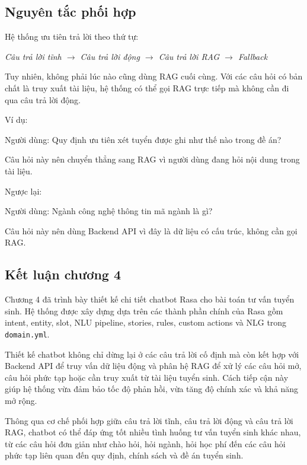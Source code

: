 \subsection*{Nguyên tắc phối hợp}

Hệ thống ưu tiên trả lời theo thứ tự:

\textit{Câu trả lời tĩnh $\rightarrow$ Câu trả lời động $\rightarrow$ Câu trả lời RAG $\rightarrow$ Fallback}

Tuy nhiên, không phải lúc nào cũng dùng RAG cuối cùng. Với các câu hỏi có bản chất là truy xuất tài liệu, hệ thống có thể gọi RAG trực tiếp mà không cần đi qua câu trả lời động.

Ví dụ:

Người dùng: Quy định ưu tiên xét tuyển được ghi như thế nào trong đề án?

Câu hỏi này nên chuyển thẳng sang RAG vì người dùng đang hỏi nội dung trong tài liệu.

Ngược lại:

Người dùng: Ngành công nghệ thông tin mã ngành là gì?

Câu hỏi này nên dùng Backend API vì đây là dữ liệu có cấu trúc, không cần gọi RAG.

\subsection*{Kết luận chương 4}

Chương 4 đã trình bày thiết kế chi tiết chatbot Rasa cho bài toán tư vấn tuyển sinh. Hệ thống được xây dựng dựa trên các thành phần chính của Rasa gồm intent, entity, slot, NLU pipeline, stories, rules, custom actions và NLG trong \texttt{domain.yml}.

Thiết kế chatbot không chỉ dừng lại ở các câu trả lời cố định mà còn kết hợp với Backend API để truy vấn dữ liệu động và phân hệ RAG để xử lý các câu hỏi mở, câu hỏi phức tạp hoặc cần truy xuất từ tài liệu tuyển sinh. Cách tiếp cận này giúp hệ thống vừa đảm bảo tốc độ phản hồi, vừa tăng độ chính xác và khả năng mở rộng.

Thông qua cơ chế phối hợp giữa câu trả lời tĩnh, câu trả lời động và câu trả lời RAG, chatbot có thể đáp ứng tốt nhiều tình huống tư vấn tuyển sinh khác nhau, từ các câu hỏi đơn giản như chào hỏi, hỏi ngành, hỏi học phí đến các câu hỏi phức tạp liên quan đến quy định, chính sách và đề án tuyển sinh.
